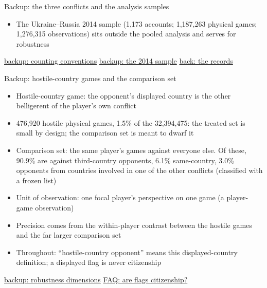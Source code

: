 \documentclass[aspectratio=169,11pt,t]{beamer}
\newcommand{\bk}[2]{\hyperlink{#1}{\textcolor{linkblue}{\scriptsize\textsf{backup: #2}}}}
\newcommand{\fq}[2]{\hyperlink{#1}{\textcolor{linkblue}{\scriptsize\textsf{FAQ: #2}}}}
\newcommand{\links}[1]{\vfill\hfill{#1}}
\begin{document}
\begin{frame}[label=bk-table1-main]{Backup: the three conflicts and the analysis samples}
\begin{flushleft}
\begin{itemize}
      \item The Ukraine--Russia 2014 sample (1,173 accounts; 1,187,263 physical games; 1,276,315 observations) sits outside the pooled analysis and serves for robustness
    \end{itemize}
  \end{flushleft}
  \links{\bk{bk-table1}{counting conventions} \quad \bk{bk-2014}{the 2014 sample} \quad \hyperlink{records}{\textcolor{linkblue}{\scriptsize\textsf{back: the records}}}}
\end{frame}

\begin{frame}[label=bk-hostile]{Backup: hostile-country games and the comparison set}
  \begin{itemize}
    \item Hostile-country game: the opponent's displayed country is the other belligerent of the player's own conflict
    \item 476,920 hostile physical games, 1.5\% of the 32,394,475: the treated set is small by design; the comparison set is meant to dwarf it
    \item Comparison set: the same player's games against everyone else. Of these, 90.9\% are against third-country opponents, 6.1\% same-country, 3.0\% opponents from countries involved in one of the other conflicts (classified with a frozen list)
    \item Unit of observation: one focal player's perspective on one game (a player-game observation)
    \item Precision comes from the within-player contrast between the hostile games and the far larger comparison set
    \item Throughout: ``hostile-country opponent'' means this displayed-country definition; a displayed flag is never citizenship
  \end{itemize}
  \links{\bk{bk-robust}{robustness dimensions} \quad \fq{faq-flags}{are flags citizenship?}}
\end{frame}
\end{document}

